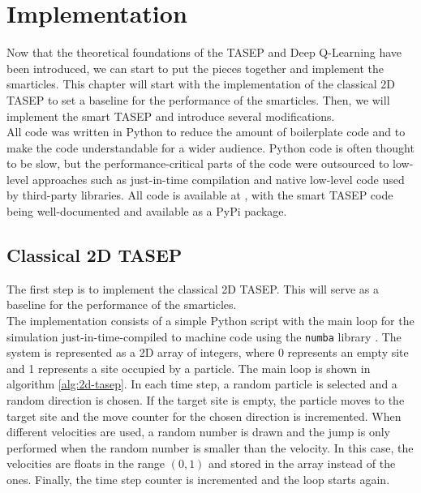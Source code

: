 \graphicspath{{img/impl/out}{img/impl}}

\chapter{Implementation}
\label{ch:implementation}
Now that the theoretical foundations of the TASEP and Deep Q-Learning have been introduced, we can start to put the pieces together and implement the smarticles. This chapter will start with the implementation of the classical 2D TASEP to set a baseline for the performance of the smarticles. Then, we will implement the smart TASEP and introduce several modifications. 
\\
All code was written in Python to reduce the amount of boilerplate code and to make the code understandable for a wider audience. Python code is often thought to be slow, but the performance-critical parts of the code were outsourced to low-level approaches such as just-in-time compilation and native low-level code used by third-party libraries. 
All code is available at \cite{maertens_smarttasep_github_2023}, with the smart TASEP code being well-documented and available as a PyPi package.

\section{Classical 2D TASEP}
\label{sec:implementation-classical-2d-tasep}
The first step is to implement the classical 2D TASEP. This will serve as a baseline for the performance of the smarticles. 
\\
The implementation consists of a simple Python script with the main loop for the simulation just-in-time-compiled to machine code using the \texttt{numba} library \cite{lam_numba_2015}. The system is represented as a 2D array of integers, where 0 represents an empty site and 1 represents a site occupied by a particle. The main loop is shown in algorithm \ref{alg:2d-tasep}. In each time step, a random particle is selected and a random direction is chosen. If the target site is empty, the particle moves to the target site and the move counter for the chosen direction is incremented. When different velocities are used, a random number is drawn and the jump is only performed when the random number is smaller than the velocity. In this case, the velocities are floats in the range $(0,1)$ and stored in the array instead of the ones. Finally, the time step counter is incremented and the loop starts again.

